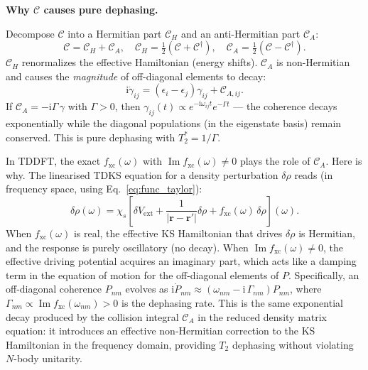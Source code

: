 \documentclass[12pt,letterpaper]{article}
\newcommand{\ii}{\mathrm{i}}
\newcommand{\fxc}{f_{\mathrm{xc}}}
\theoremstyle{definition}
\begin{document}
\begin{derivbox}
\textbf{Why $\mathcal{C}$ causes pure dephasing.}

Decompose $\mathcal{C}$ into a Hermitian part $\mathcal{C}_H$ and an
anti-Hermitian part $\mathcal{C}_A$:
\[
  \mathcal{C} = \mathcal{C}_H + \mathcal{C}_A,
  \quad
  \mathcal{C}_H = \tfrac{1}{2}(\mathcal{C}+\mathcal{C}^\dagger),
  \quad
  \mathcal{C}_A = \tfrac{1}{2}(\mathcal{C}-\mathcal{C}^\dagger).
\]
$\mathcal{C}_H$ renormalizes the effective Hamiltonian (energy shifts).
$\mathcal{C}_A$ is non-Hermitian and causes the \emph{magnitude} of
off-diagonal elements to decay:
\[
  \ii\dot{\gamma}_{ij} = (\epsilon_i - \epsilon_j)\gamma_{ij}
  + \mathcal{C}_{A,ij}.
\]
If $\mathcal{C}_A = -\ii\Gamma\,\gamma$ with $\Gamma > 0$, then
$\gamma_{ij}(t) \propto e^{-\ii\omega_{ij}t}e^{-\Gamma t}$ ---
the coherence decays exponentially while the diagonal populations
(in the eigenstate basis) remain conserved.  This is pure dephasing
with $T_2^* = 1/\Gamma$.
\end{derivbox}

In TDDFT, the exact $\fxc(\omega)$ with
$\operatorname{Im}\fxc(\omega)\neq 0$ plays the role of $\mathcal{C}_A$.
Here is why.
The linearised TDKS equation for a density perturbation $\delta\rho$ reads
(in frequency space, using Eq.~\ref{eq:func_taylor}):
\begin{equation}
  \delta\rho(\omega)
  = \chi_s\!\left[\delta V_{\mathrm{ext}}
    + \frac{1}{|\bm{r}-\bm{r}'|}\delta\rho
    + \fxc(\omega)\,\delta\rho\right]\!(\omega).
\end{equation}
When $\fxc(\omega)$ is real, the effective KS Hamiltonian that drives
$\delta\rho$ is Hermitian, and the response is purely oscillatory (no
decay).
When $\operatorname{Im}\fxc(\omega)\neq 0$, the effective driving potential
acquires an imaginary part, which acts like a damping term in the equation
of motion for the off-diagonal elements of $P$.  Specifically, an
off-diagonal coherence $P_{nm}$ evolves as
$\ii\dot{P}_{nm} \approx (\omega_{nm} - \ii\,\Gamma_{nm})P_{nm}$,
where $\Gamma_{nm} \propto \operatorname{Im}\fxc(\omega_{nm}) > 0$
is the dephasing rate.  This is the same exponential decay produced by
the collision integral $\mathcal{C}_A$ in the reduced density matrix
equation:
it introduces an effective non-Hermitian correction to the KS
Hamiltonian in the frequency domain, providing $T_2$ dephasing without
violating $N$-body unitarity.
\end{document}
